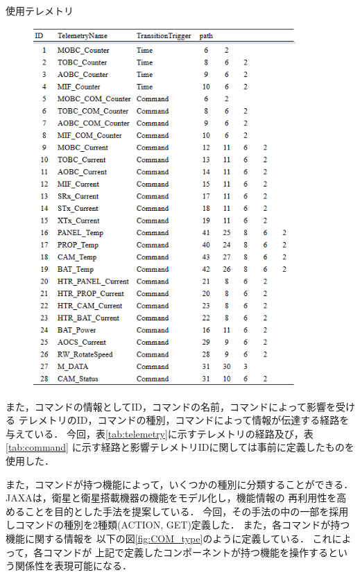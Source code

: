 \documentclass[11pt]{jsreport}
\begin{document}
\newpage
\begin{table}[H]
   \centering
   \caption{使用テレメトリ}
   \label{tab:telemetry}
\end{table}
\vspace{-2zh}
\begin{figure}[H]
   \centering
      \includegraphics[width=10.0cm]{figure/TEL.png}
\end{figure}

また，コマンドの情報としてID，コマンドの名前，コマンドによって影響を受ける
テレメトリのID，コマンドの種別，コマンドによって情報が伝達する経路を与えている．
今回，表\ref{tab:telemetry}に示すテレメトリの経路及び，表\ref{tab:command}
に示す経路と影響テレメトリIDに関しては事前に定義したものを使用した．

また，コマンドが持つ機能によって，いくつかの種別に分類することができる．
JAXA\cite{JAXA2020}は，衛星と衛星搭載機器の機能をモデル化し，機能情報の
再利用性を高めることを目的とした手法を提案している．
今回，その手法の中の一部を採用しコマンドの種別を2種類(ACTION, GET)定義した．
また，各コマンドが持つ機能に関する情報を
以下の図\ref{fig:COM_type}のように定義している．
これによって，各コマンドが
上記で定義したコンポーネントが持つ機能を操作するという関係性を表現可能になる．
\end{document}

